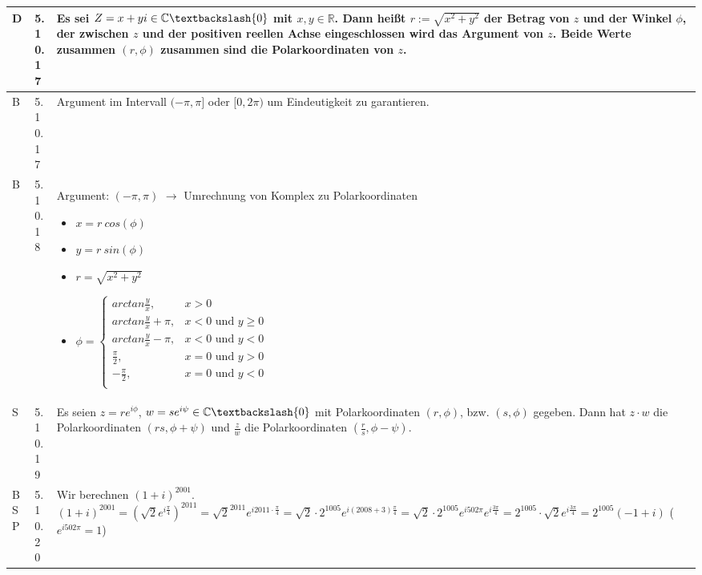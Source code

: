     \begin{longtable}{p{0.75cm} p{1cm} p{16cm}}
        \toprule
        D   & 5.10.17&  Es sei $Z = x + yi \in \mathbb{C} \textbackslash \{0\}$ mit $x,y \in \mathbb{R}$. Dann heißt $r:= \sqrt{x^2+y^2}$ der \textbf{Betrag}
                        von $z$ und der Winkel $\phi$, der zwischen $z$ und der positiven reellen Achse eingeschlossen wird das \textbf{Argument} von $z$.
                        Beide Werte zusammen $(r,\phi)$ zusammen sind die \textbf{Polarkoordinaten} von $z$.\\
        \midrule
        B   & 5.10.17&  Argument im Intervall $(-\pi, \pi]$ oder $[0, 2\pi)$ um Eindeutigkeit zu garantieren. \\
        \midrule
        B   & 5.10.18&  Argument: $(-\pi, \pi)$ $\rightarrow$ Umrechnung von Komplex zu Polarkoordinaten
                        \begin{itemize}[topsep=-0.5cm]
                            \item[] $x = r~cos(\phi)$
                            \item[] $y= r~sin(\phi)$ 
                            \item[] $r = \sqrt{x^2+y^2}$
                            \item[] $\phi = \begin{cases}
                                            arctan\frac{y}{x}, & x > 0 \\
                                            arctan\frac{y}{x}+\pi, & x<0 \text{ und } y \geq 0 \\
                                            arctan\frac{y}{x}-\pi, & x<0 \text{ und } y < 0 \\
                                            \frac{\pi}{2}, & x=0 \text{ und } y > 0 \\
                                            -\frac{\pi}{2}, & x=0 \text{ und } y < 0 \\
                                            \end{cases}$   
                        \end{itemize}\\
        \midrule
        S   & 5.10.19&  Es seien $z=re^{i\phi}$, $w=se^{i\psi} \in \mathbb{C} \textbackslash \{0\}$ mit Polarkoordinaten $(r,\phi)$, bzw. $(s,\phi)$
                        gegeben. Dann hat $z \cdot w$ die Polarkoordinaten $(rs, \phi + \psi)$ und $\frac{z}{w}$ die Polarkoordinaten
                        $(\frac{r}{s}, \phi - \psi)$. \\
        \midrule
        BSP & 5.10.20&  Wir berechnen $(1+i)^{2001}$. \hfill \break
                        $(1+i)^{2001} = (\sqrt{2}e^{i\frac{\pi}{4}})^{2011} = \sqrt{2}^{2011} e^{i2011\cdot \frac{\pi}{4}} =
                        \sqrt{2} \cdot 2^{1005} e^{i(2008+3)\frac{\pi}{4}} = \sqrt{2} \cdot 2^{1005} e^{i502\pi}e^{i\frac{3\pi}{4}}= 
                        2^{1005} \cdot \sqrt{2} e^{i\frac{3\pi}{4}} = 2^{1005} (-1+i)$ ($e^{i502\pi} =1$)\\
        \bottomrule

    \end{longtable}

